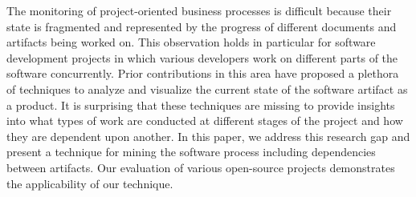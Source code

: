 
The monitoring of project-oriented business processes is difficult because their state is fragmented and represented by the progress of different documents and artifacts being worked on. This observation holds in particular for software development projects in which various developers work on different parts of the software concurrently. Prior contributions in this area have proposed a plethora of techniques to analyze and visualize the current state of the software artifact as a product. It is surprising that these techniques are missing to provide insights into what types of work are conducted at different stages of the project and how they are dependent upon another. In this paper, we address this research gap and present a technique for mining the software process including dependencies between artifacts. Our evaluation of various open-source projects demonstrates the applicability of our technique. 